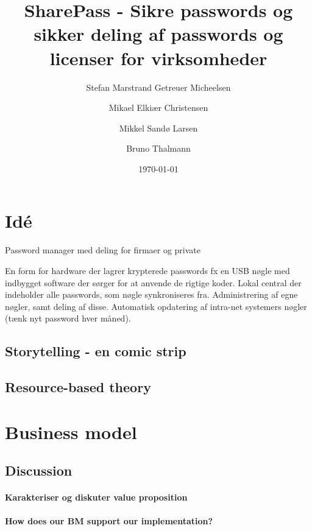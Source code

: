 \documentclass[a4paper]{article}
\title{SharePass - Sikre passwords og sikker deling af passwords og licenser for virksomheder}
\author{Stefan Marstrand Getreuer Micheelsen \and Mikael Elkiær Christensen \and Mikkel Sandø Larsen \and Bruno Thalmann}
\date{\today}
\begin{document}
\maketitle
{}

\section{Idé}
Password manager med deling for firmaer og private

En form for hardware der lagrer krypterede passwords fx en USB nøgle med indbygget software der sørger for at anvende de rigtige koder.
Lokal central der indeholder alle passwords, som nøgle synkroniseres fra.
Administrering af egne nøgler, samt deling af disse.
Automatisk opdatering af intra-net systemers nøgler (tænk nyt password hver måned).

\subsection{Storytelling - en comic strip}



\subsection{Resource-based theory}




\section{Business model}

\subsection{Discussion}
\paragraph{Karakteriser og diskuter value proposition}
\paragraph{How does our BM support our implementation?}
\end{document}
